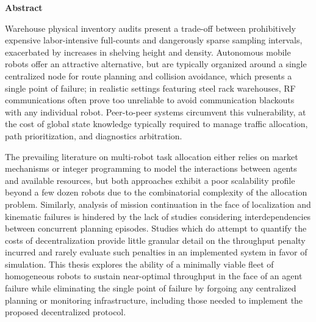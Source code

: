 \thispagestyle{empty}
\vspace*{1.0cm}

\begin{center}
    \textbf{Abstract}
\end{center}

\vspace*{0.5cm}

\noindent
Warehouse physical inventory audits present a trade-off between prohibitively expensive labor-intensive full-counts and dangerously sparse sampling intervals, exacerbated by increases in shelving height and density. Autonomous mobile robots offer an attractive alternative, but are typically organized around a single centralized node for route planning and collision avoidance, which presents a single point of failure; in realistic settings featuring steel rack warehouses, RF communications often prove too unreliable to avoid communication blackouts with any individual robot. Peer-to-peer systems circumvent this vulnerability, at the cost of global state knowledge typically required to manage traffic allocation, path prioritization, and diagnostics arbitration.

\vspace*{0.3cm}
\noindent
The prevailing literature on multi-robot task allocation either relies on market mechanisms or integer programming to model the interactions between agents and available resources, but both approaches exhibit a poor scalability profile beyond a few dozen robots due to the combinatorial complexity of the allocation problem. Similarly, analysis of mission continuation in the face of localization and kinematic failures is hindered by the lack of studies considering interdependencies between concurrent planning episodes. Studies which do attempt to quantify the costs of decentralization provide little granular detail on the throughput penalty incurred and rarely evaluate such penalties in an implemented system in favor of simulation. This thesis explores the ability of a minimally viable fleet of homogeneous robots to sustain near-optimal throughput in the face of an agent failure while eliminating the single point of failure by forgoing any centralized planning or monitoring infrastructure, including those needed to implement the proposed decentralized protocol.

